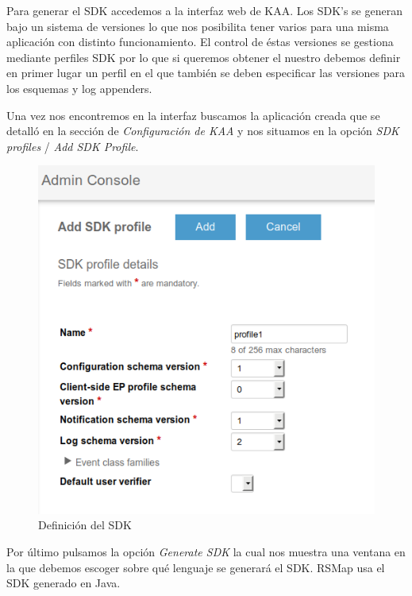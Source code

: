 \bigskip

Para generar el SDK accedemos a la interfaz web de KAA. Los SDK's se generan bajo un sistema de versiones lo que nos posibilita tener varios para una misma aplicación con distinto funcionamiento. El control de éstas versiones se gestiona mediante perfiles SDK por lo que si queremos obtener el nuestro debemos definir en primer lugar un perfil en el que también se deben especificar las versiones para los esquemas y log appenders.

Una vez nos encontremos en la interfaz buscamos la aplicación creada que se detalló en la sección de \textit{Configuración de KAA} y nos situamos en la opción \textit{SDK profiles} / \textit{Add SDK Profile}.


\begin{figure}[!ht]
  \begin{center}
    \includegraphics[scale=0.30]{../images/sdk/1.png}
		\caption{Definición del SDK}
    \label{fig:kaa}
	\end{center}
\end{figure}

\newpage

Por último pulsamos la opción \textit{Generate SDK} la cual nos muestra una ventana en la que debemos escoger sobre qué lenguaje se generará el SDK. RSMap usa el SDK generado en Java.


